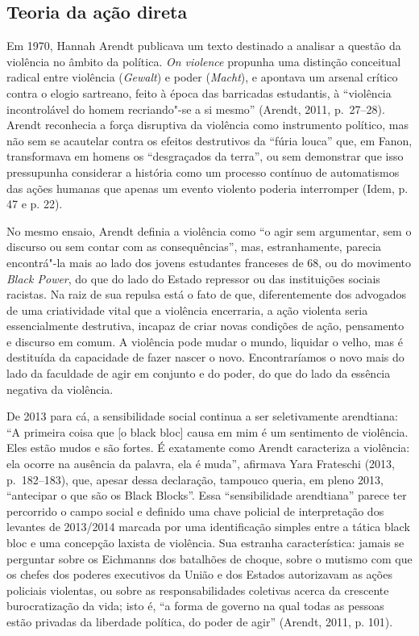 \subsection{Teoria da ação direta}

Em 1970, Hannah Arendt publicava um
texto destinado a analisar a questão da violência no âmbito da política.
\emph{On violence} propunha uma distinção conceitual radical entre
violência (\emph{Gewalt}) e poder (\emph{Macht}), e apontava um arsenal
crítico contra o elogio sartreano, feito à época das barricadas
estudantis, à ``violência incontrolável do homem recriando"-se a si
mesmo'' (Arendt, 2011, p.~27--28). Arendt reconhecia a força disruptiva
da violência como instrumento político, mas não sem se acautelar contra
os efeitos destrutivos da ``fúria louca'' que, em Fanon, transformava em
homens os ``desgraçados da terra'', ou sem demonstrar que isso
pressupunha considerar a história como um processo contínuo de
automatismos das ações humanas que apenas um evento violento poderia
interromper (Idem, p. 47 e p. 22).

No mesmo ensaio, Arendt definia a violência como ``o agir sem
argumentar, sem o discurso ou sem contar com as consequências'', mas,
estranhamente, parecia encontrá"-la mais ao lado dos jovens estudantes
franceses de 68, ou do movimento \emph{Black Power}, do que do lado do
Estado repressor ou das instituições sociais racistas. Na raiz de sua
repulsa está o fato de que, diferentemente dos advogados de uma
criatividade vital que a violência encerraria, a ação violenta seria
essencialmente destrutiva, incapaz de criar novas condições de ação,
pensamento e discurso em comum. A violência pode mudar o mundo, liquidar
o velho, mas é destituída da capacidade de fazer nascer o novo.
Encontraríamos o novo mais do lado da faculdade de agir em conjunto e do
poder, do que do lado da essência negativa da violência.

De 2013 para cá, a sensibilidade social continua a ser seletivamente
arendtiana: ``A primeira coisa que {[}o black bloc{]} causa em
mim é um sentimento de violência. Eles estão mudos e são fortes. É
exatamente como Arendt caracteriza a violência: ela ocorre na ausência
da palavra, ela é muda'', afirmava Yara Frateschi (2013, p.~182--183),
que, apesar dessa declaração, tampouco queria, em pleno 2013,
``antecipar o que são os Black Blocks''. Essa ``sensibilidade
arendtiana'' parece ter percorrido o campo social e definido uma chave
policial de interpretação dos levantes de 2013/2014 marcada por uma
identificação simples entre a tática black bloc e uma concepção
laxista de violência. Sua estranha característica: jamais se perguntar
sobre os Eichmanns dos batalhões de choque, sobre o mutismo com
que os chefes dos poderes executivos da União e dos Estados autorizavam
as ações policiais violentas, ou sobre as responsabilidades coletivas
acerca da crescente burocratização da vida; isto é, ``a forma de governo
na qual todas as pessoas estão privadas da liberdade política, do poder
de agir'' (Arendt, 2011, p. 101).

